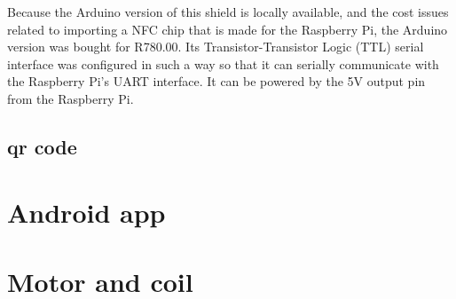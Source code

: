 Because the Arduino version of this shield is locally available, and the cost issues related
to importing a NFC chip that is made for the Raspberry Pi, the Arduino version was bought for 
R780.00. Its Transistor-Transistor Logic (TTL) serial interface was configured in such a way
so that it can serially communicate with the Raspberry Pi's UART interface. It can be powered
by the 5V output pin from the Raspberry Pi. 

\subsection{qr code}

\section{Android app}

\section{Motor and coil}
\label{sec:detail-switch}